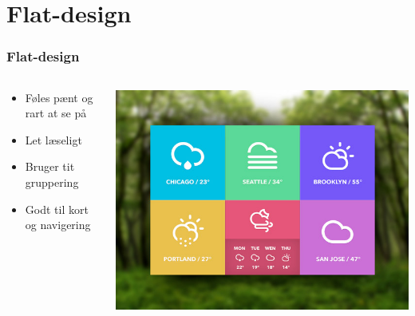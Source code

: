 \documentclass{beamer}
\begin{document}
\section{Flat-design}
\begin{frame}
  \frametitle{Flat-design}
  \begin{columns}[T]
    \begin{column}{0.5\textwidth}
      \begin{itemize}
	    \item Føles pænt og rart at se på
	    \item Let læseligt
	    \item Bruger tit gruppering
	    \item Godt til kort og navigering
      \end{itemize}  
    \end{column}
    \begin{column}{.5\textwidth}
      \includegraphics[width=\textwidth]{flat.jpg}
    \end{column}
  \end{columns}
\end{frame}
\end{document}
